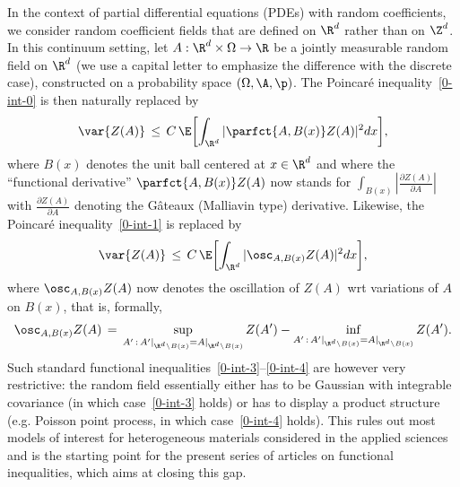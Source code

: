 
In the context of partial differential equations (PDEs) with random coefficients, we consider random coefficient fields that are defined on $\R^d$ rather than on $\Z^d$. In this continuum setting, let $A:\R^d\times\Omega\to\R$ be a jointly measurable random field on $\R^d$ (we use a capital letter to emphasize the difference with the discrete case), constructed on a probability space $(\Omega,\A,\p)$. The Poincaré inequality~\eqref{0-int-0} is then naturally replaced by
\begin{equation}\label{0-int-3}
\var{Z(A)} \,\le \,C\, \E\bigg[{\int_{\R^d} |\parfct{A,B(x)} Z(A)|^2dx}\bigg],
\end{equation}
where $B(x)$ denotes the unit ball centered at $x\in \R^d$ and where the ``functional derivative'' $\parfct{A,B(x)} Z(A)$ now stands for $\int_{B(x)}|\frac{\partial Z(A)}{\partial A}|$ with $\frac{\partial Z(A)}{\partial A}$ denoting the G\^ateaux (Malliavin type) derivative. Likewise, the Poincaré inequality~\eqref{0-int-1} is replaced by
\begin{equation}\label{0-int-4}
\var{Z(A)} \,\le \,C\,\E\bigg[{\int_{\R^d}|\osc_{A,B(x)} Z(A)|^2dx}\bigg],
\end{equation}
where $\osc_{A,B(x)} Z(A)$ now denotes the oscillation of $Z(A)$ wrt variations of $A$ on $B(x)$, that is, formally,
\[
\osc_{A,B(x)} Z(A)\,=\,\sup_{A'\,:\, A'|_{\R^d\setminus B(x)}=A|_{\R^d\setminus B(x)}} Z(A')-\inf_{A'\,:\, A'|_{\R^d\setminus B(x)}=A|_{\R^d\setminus B(x)}} Z(A').
\]
Such standard functional inequalities~\eqref{0-int-3}--\eqref{0-int-4} are however very restrictive: the random field essentially either has to be Gaussian with integrable covariance (in which case~\eqref{0-int-3} holds) or has to display a product structure (e.g. Poisson point process, in which case~\eqref{0-int-4} holds). This rules out most models of interest for heterogeneous materials considered in the applied sciences~\cite{Torquato-02} and is the starting point for the present series of articles on functional inequalities, which aims at closing this gap.


